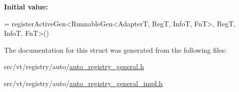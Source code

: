 {\bfseries Initial value\+:}
\begin{DoxyCode}
=
  registerActiveGen<RunnableGen<AdapterT, RegT, InfoT, FnT>, RegT, InfoT, FnT>()
\end{DoxyCode}


The documentation for this struct was generated from the following files\+:\begin{DoxyCompactItemize}
\item 
src/vt/registry/auto/\hyperlink{auto__registry__general_8h}{auto\+\_\+registry\+\_\+general.\+h}\item 
src/vt/registry/auto/\hyperlink{auto__registry__general__impl_8h}{auto\+\_\+registry\+\_\+general\+\_\+impl.\+h}\end{DoxyCompactItemize}
